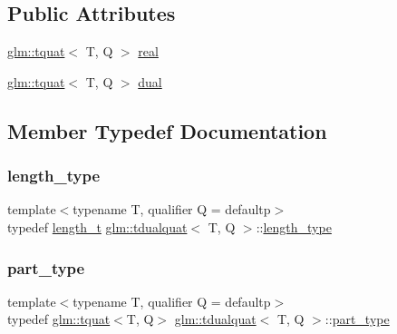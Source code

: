 \subsection*{Public Attributes}
\begin{DoxyCompactItemize}
\item 
\hyperlink{structglm_1_1tquat}{glm\+::tquat}$<$ T, Q $>$ \hyperlink{structglm_1_1tdualquat_a25909f92feb14a77756d2e83f9ec0b20}{real}
\item 
\hyperlink{structglm_1_1tquat}{glm\+::tquat}$<$ T, Q $>$ \hyperlink{structglm_1_1tdualquat_a6e9bac4577ea5ff7e47104c183f3955a}{dual}
\end{DoxyCompactItemize}


\subsection{Member Typedef Documentation}
\mbox{\label{structglm_1_1tdualquat_ad9fa4fd7f84d17bebd3efed6b5455d80}} 
\subsubsection{\texorpdfstring{length\+\_\+type}{length\_type}}
{\footnotesize\ttfamily template$<$typename T, qualifier Q = defaultp$>$ \\
typedef \hyperlink{namespaceglm_a090a0de2260835bee80e71a702492ed9}{length\+\_\+t} \hyperlink{structglm_1_1tdualquat}{glm\+::tdualquat}$<$ T, Q $>$\+::\hyperlink{structglm_1_1tdualquat_ad9fa4fd7f84d17bebd3efed6b5455d80}{length\+\_\+type}}

\mbox{\label{structglm_1_1tdualquat_ab18b8665bbd568f9bc93ef93ed475a47}} 
\subsubsection{\texorpdfstring{part\+\_\+type}{part\_type}}
{\footnotesize\ttfamily template$<$typename T, qualifier Q = defaultp$>$ \\
typedef \hyperlink{structglm_1_1tquat}{glm\+::tquat}$<$T, Q$>$ \hyperlink{structglm_1_1tdualquat}{glm\+::tdualquat}$<$ T, Q $>$\+::\hyperlink{structglm_1_1tdualquat_ab18b8665bbd568f9bc93ef93ed475a47}{part\+\_\+type}}

